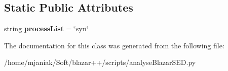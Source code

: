\subsection*{Static Public Attributes}
\begin{DoxyCompactItemize}
\item 
\hypertarget{classanalyseBlazarSED_1_1blazarPlotter_adca8748ee9e653529fe1f14bdaa763e0}{string {\bfseries process\-List} = \char`\"{}syn\char`\"{}}\label{classanalyseBlazarSED_1_1blazarPlotter_adca8748ee9e653529fe1f14bdaa763e0}

\end{DoxyCompactItemize}


The documentation for this class was generated from the following file\-:\begin{DoxyCompactItemize}
\item 
/home/mjaniak/\-Soft/blazar++/scripts/analyse\-Blazar\-S\-E\-D.\-py\end{DoxyCompactItemize}
